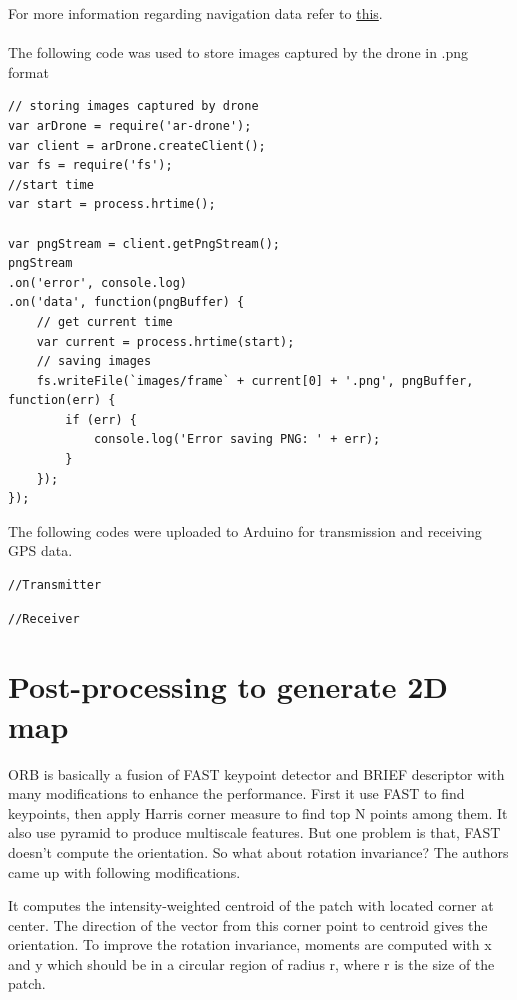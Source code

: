 \documentclass[
  journal=largetwo,
  manuscript=article-type,
  year=2023,
  volume=1,
]{iitp-journal}
\begin{document}
For more information regarding navigation data refer to \href{https://github.com/felixge/node-ar-drone/blob/master/docs/NavData.md}{this}.
\\
\\
The following code was used to store images captured by the drone in .png format
\begin{verbatim}
// storing images captured by drone
var arDrone = require('ar-drone');
var client = arDrone.createClient();
var fs = require('fs');
//start time
var start = process.hrtime();

var pngStream = client.getPngStream();
pngStream
.on('error', console.log)
.on('data', function(pngBuffer) {
    // get current time
    var current = process.hrtime(start);
    // saving images
    fs.writeFile(`images/frame` + current[0] + '.png', pngBuffer, function(err) {
        if (err) {
            console.log('Error saving PNG: ' + err);
        }
    });
});

\end{verbatim}

The following codes were uploaded to Arduino for transmission and receiving GPS data.
\begin{verbatim}
//Transmitter
\end{verbatim}

\begin{verbatim}
//Receiver
\end{verbatim}

\section{Post-processing to generate 2D map}
ORB is basically a fusion of FAST keypoint detector and BRIEF descriptor with many modifications to enhance the performance. First it use FAST to find keypoints, then apply Harris corner measure to find top N points among them. It also use pyramid to produce multiscale features. But one problem is that, FAST doesn't compute the orientation. So what about rotation invariance? The authors came up with following modifications.

It computes the intensity-weighted centroid of the patch with located corner at center. The direction of the vector from this corner point to centroid gives the orientation. To improve the rotation invariance, moments are computed with x and y which should be in a circular region of radius r, where r is the size of the patch.
\end{document}
